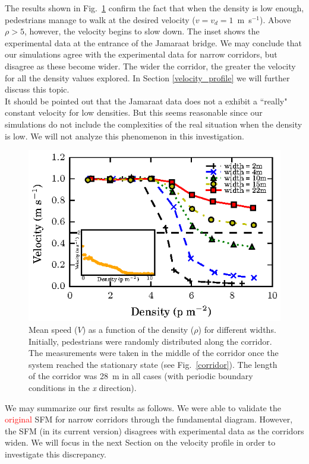 \documentclass[preprint,12pt]{elsarticle}
\begin{document}
The results shown in Fig.~\ref{fundamental_diagram_speed} confirm the fact that when the density is low enough, pedestrians manage to walk at the desired velocity ($v=v_d=1$~m~s$^{-1}$). Above $\rho>5$, however, the velocity begins to slow down. The inset shows the experimental data at the entrance of the Jamaraat bridge. We may conclude that our simulations agree with the experimental data for narrow corridors, but disagree as these become wider. The wider the corridor, the greater the velocity for all the density values explored. In Section \ref{velocity_profile} we will further discuss this topic.\\

It should be pointed out that the Jamaraat data does not a exhibit a ``really" constant velocity for low densities. But this seems reasonable since our simulations do not include the complexities of the real situation when the density is low. We will not analyze this phenomenon in this investigation. \\

\begin{figure}[htbp!]
\centering
\includegraphics[width=0.7\columnwidth]
{./speed-density_vd1_multiple_widths.eps}
\caption{\label{fundamental_diagram_speed} Mean speed ($V$) as a function of the density ($\rho$) for different widths. Initially, 
pedestrians were randomly distributed along the corridor. The measurements were taken in the middle
of the corridor once the system reached the stationary state (see Fig.~\ref{corridor}). The length of the corridor 
was 28~m in all cases (with periodic boundary conditions in the \textit{x} direction).}
\end{figure}

We may summarize our first results as follows. We were able to validate the 
\textcolor{red}{original} SFM for narrow corridors through the fundamental 
diagram. However, the SFM (in its current version) disagrees with experimental 
data as the corridors widen. We will focus in the next Section on the velocity 
profile in order to investigate this discrepancy. 
\end{document}
